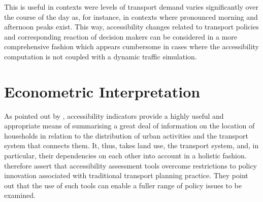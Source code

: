 This is useful in contexts were levels of transport demand varies significantly over the course of the day as, for instance, 
in contexts where pronounced morning and afternoon peaks exist. This way, accessibility changes related to transport policies
and corresponding reaction of decision makers can be considered in a more comprehensive fashion which appears cumbersome in 
cases where the accessibility computation is not coupled with a dynamic traffic simulation.


\section{Econometric Interpretation}
As pointed out by \citet{MorrisEtAl1978AccessibilityIndicatorsaccessibility}, accessibility indicators provide a highly
useful and appropriate means of summarising a great deal of information on the location of households in relation to 
the distribution of urban activities and the transport system that connects them.
%
%
It, thus, takes land use, the transport system, and, in particular, their dependencies on each other into
account in a holistic fashion.
%
%
\citet{CurtisEtAl2013AccessbilityPolicyInnovation} therefore assert that accessibility assessment tools overcome
restrictions to policy innovation associated with traditional transport planning practice. They point out that the use of
such tools can enable a fuller range of policy issues to be examined.


